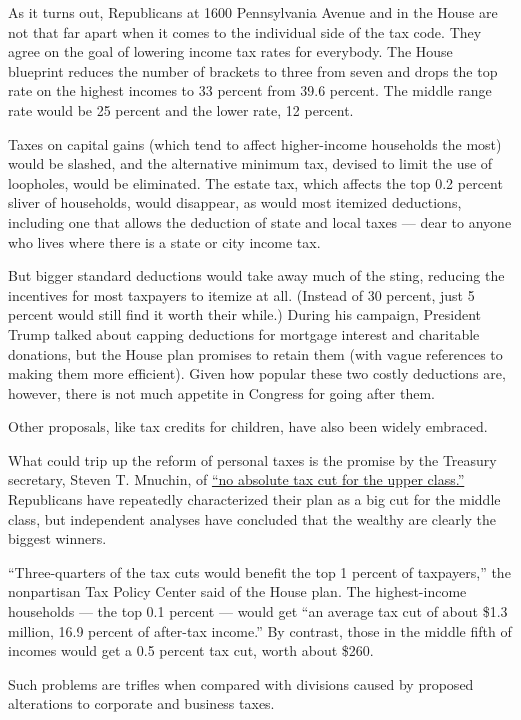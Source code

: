 As it turns out, Republicans at 1600 Pennsylvania Avenue and in the
House are not that far apart when it comes to the individual side of the
tax code. They agree on the goal of lowering income tax rates for
everybody. The House blueprint reduces the number of brackets to three
from seven and drops the top rate on the highest incomes to 33 percent
from 39.6 percent. The middle range rate would be 25 percent and the
lower rate, 12 percent.

Taxes on capital gains (which tend to affect higher-income households
the most) would be slashed, and the alternative minimum tax, devised to
limit the use of loopholes, would be eliminated. The estate tax, which
affects the top 0.2 percent sliver of households, would disappear, as
would most itemized deductions, including one that allows the deduction
of state and local taxes --- dear to anyone who lives where there is a
state or city income tax.

But bigger standard deductions would take away much of the sting,
reducing the incentives for most taxpayers to itemize at all. (Instead
of 30 percent, just 5 percent would still find it worth their while.)
During his campaign, President Trump talked about capping deductions for
mortgage interest and charitable donations, but the House plan promises
to retain them (with vague references to making them more efficient).
Given how popular these two costly deductions are, however, there is not
much appetite in Congress for going after them.

Other proposals, like tax credits for children, have also been widely
embraced.

What could trip up the reform of personal taxes is the promise by the
Treasury secretary, Steven T. Mnuchin, of
\href{https://www.nytimes.com/2017/02/09/business/economy/mnuchin-rule-tax-cut.html}{``no
absolute tax cut for the upper class.''} Republicans have repeatedly
characterized their plan as a big cut for the middle class, but
independent analyses have concluded that the wealthy are clearly the
biggest winners.

``Three-quarters of the tax cuts would benefit the top 1 percent of
taxpayers,'' the nonpartisan Tax Policy Center said of the House plan.
The highest-income households --- the top 0.1 percent --- would get ``an
average tax cut of about \$1.3 million, 16.9 percent of after-tax
income.'' By contrast, those in the middle fifth of incomes would get a
0.5 percent tax cut, worth about \$260.

Such problems are trifles when compared with divisions caused by
proposed alterations to corporate and business taxes.

